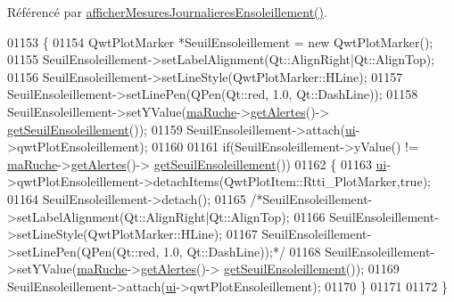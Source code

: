 Référencé par \hyperlink{class_ruche_ihm_abc250d15e6782c522b3d6676e0ee032d}{afficher\+Mesures\+Journalieres\+Ensoleillement()}.


\begin{DoxyCode}
01153 \{
01154     QwtPlotMarker *SeuilEnsoleillement = \textcolor{keyword}{new} QwtPlotMarker();
01155     SeuilEnsoleillement->setLabelAlignment(Qt::AlignRight|Qt::AlignTop);
01156     SeuilEnsoleillement->setLineStyle(QwtPlotMarker::HLine);
01157     SeuilEnsoleillement->setLinePen(QPen(Qt::red, 1.0, Qt::DashLine));
01158     SeuilEnsoleillement->setYValue(\hyperlink{class_ruche_ihm_a43a6b1fa31f4fba58d919daae3707b38}{maRuche}->\hyperlink{class_ruche_a9edbc2e81ccb2cb76de43639bcb16ec1}{getAlertes}()->
      \hyperlink{class_alertes_a54900058557979664d25137399ae2512}{getSeuilEnsoleillement}());
01159     SeuilEnsoleillement->attach(\hyperlink{class_ruche_ihm_a64786058bd7f88ca2f1e9743bb27c25b}{ui}->qwtPlotEnsoleillement);
01160 
01161     \textcolor{keywordflow}{if}(SeuilEnsoleillement->yValue() != \hyperlink{class_ruche_ihm_a43a6b1fa31f4fba58d919daae3707b38}{maRuche}->\hyperlink{class_ruche_a9edbc2e81ccb2cb76de43639bcb16ec1}{getAlertes}()->
      \hyperlink{class_alertes_a54900058557979664d25137399ae2512}{getSeuilEnsoleillement}())
01162     \{
01163         \hyperlink{class_ruche_ihm_a64786058bd7f88ca2f1e9743bb27c25b}{ui}->qwtPlotEnsoleillement->detachItems(QwtPlotItem::Rtti\_PlotMarker,\textcolor{keyword}{true});
01164         SeuilEnsoleillement->detach();
01165         \textcolor{comment}{/*SeuilEnsoleillement->setLabelAlignment(Qt::AlignRight|Qt::AlignTop);}
01166 \textcolor{comment}{        SeuilEnsoleillement->setLineStyle(QwtPlotMarker::HLine);}
01167 \textcolor{comment}{        SeuilEnsoleillement->setLinePen(QPen(Qt::red, 1.0, Qt::DashLine));*/}
01168         SeuilEnsoleillement->setYValue(\hyperlink{class_ruche_ihm_a43a6b1fa31f4fba58d919daae3707b38}{maRuche}->\hyperlink{class_ruche_a9edbc2e81ccb2cb76de43639bcb16ec1}{getAlertes}()->
      \hyperlink{class_alertes_a54900058557979664d25137399ae2512}{getSeuilEnsoleillement}());
01169         SeuilEnsoleillement->attach(\hyperlink{class_ruche_ihm_a64786058bd7f88ca2f1e9743bb27c25b}{ui}->qwtPlotEnsoleillement);
01170     \}
01171 
01172 \}
\end{DoxyCode}
\mbox{\label{class_ruche_ihm_ae572f3f2b76e8c9b14a699d3e29422ee}} 
